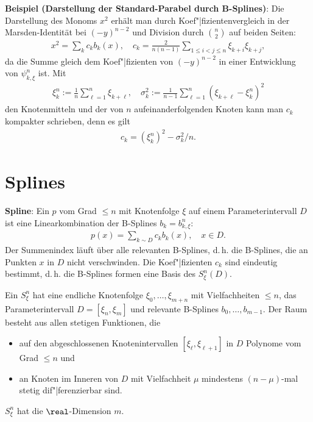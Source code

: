 \linie

\textbf{Beispiel (Darstellung der Standard-Parabel durch B-Splines)}:
Die Darstellung des Monoms $x^2$ erhält man durch Koef"|fizientenvergleich in der Marsden-Identität
bei $(-y)^{n-2}$ und Division durch $\binom{n}{2}$ auf beiden Seiten:
\begin{align*}
    x^2 = \sum_k c_k b_k(x),\quad
    c_k = \frac{2}{n(n - 1)} \sum_{1 \le i < j \le n} \xi_{k+i}\xi_{k+j},
\end{align*}
da die Summe gleich dem Koef"|fizienten von $(-y)^{n-2}$ in einer Entwicklung von $\psi_{k,\xi}^n$
ist.
Mit
\begin{align*}
    \xi_k^n := \frac{1}{n} \sum_{\ell=1}^n \xi_{k+\ell},\quad
    \sigma_k^2 := \frac{1}{n - 1} \sum_{\ell=1}^n (\xi_{k+\ell} - \xi_k^n)^2
\end{align*}
den Knotenmitteln und der  von $n$ aufeinanderfolgenden Knoten kann
man $c_k$ kompakter schrieben, denn es gilt
\begin{align*}
    c_k = (\xi_k^n)^2 - \sigma_k^2/n.
\end{align*}

\section{%
    Splines%
}

\textbf{Spline}:
Ein  $p$ vom Grad $\le n$ mit Knotenfolge $\xi$ auf einem Parameterintervall $D$
ist eine Linearkombination der B-Splines $b_k = b_{k,\xi}^n$:
\begin{align*}
    p(x) = \sum_{k \sim D} c_k b_k(x),\quad
    x \in D.
\end{align*}
Der Summenindex läuft über alle relevanten B-Splines, d.\,h. die B-Splines, die an Punkten $x$ in
$D$ nicht verschwinden.
Die Koef"|fizienten $c_k$ sind eindeutig bestimmt, d.\,h. die B-Splines formen eine Basis des
 $S_\xi^n(D)$.

Ein  $S_\xi^n$ hat eine endliche Knotenfolge
$\xi_0, \dotsc, \xi_{m+n}$ mit Vielfachheiten $\le n$, das Parameterintervall $D = [\xi_n, \xi_m]$
und relevante B-Splines $b_0, \dotsc, b_{m-1}$.
Der Raum besteht aus allen stetigen Funktionen, die
\begin{itemize}
    \item
    auf den abgeschlossenen Knotenintervallen $[\xi_\ell, \xi_{\ell+1}]$ in $D$
    Polynome vom Grad $\le n$ und

    \item
    an Knoten im Inneren von $D$ mit Vielfachheit $\mu$
    mindestens $(n - \mu)$-mal stetig dif"|ferenzierbar sind.
\end{itemize}
$S_\xi^n$ hat die $\real$-Dimension $m$.

